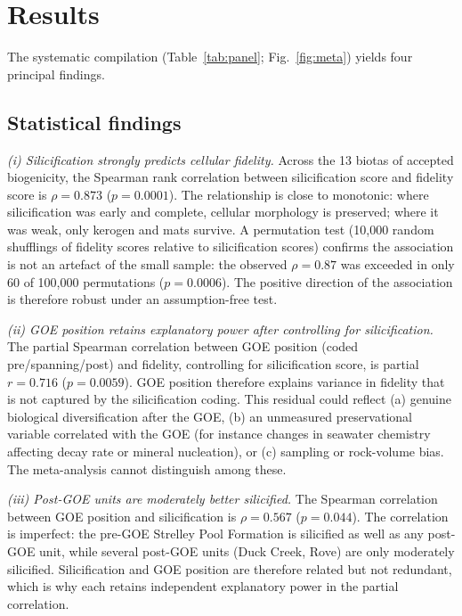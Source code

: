 \documentclass[11pt]{article}
\begin{document}
\section{Results}

The systematic compilation (Table~\ref{tab:panel}; Fig.~\ref{fig:meta}) yields four principal
findings.

\subsection{Statistical findings}

\textit{(i) Silicification strongly predicts cellular fidelity.} Across the 13 biotas of accepted
biogenicity, the Spearman rank correlation between silicification score and fidelity score is
$\rho = 0.873$ ($p = 0.0001$). The relationship is close to monotonic: where silicification was
early and complete, cellular morphology is preserved; where it was weak, only kerogen and mats
survive. A permutation test (10{,}000 random shufflings of fidelity scores relative to silicification
scores) confirms the association is not an artefact of the small sample: the observed $\rho = 0.87$
was exceeded in only 60 of 100{,}000 permutations ($p = 0.0006$). The positive direction of the
association is therefore robust under an assumption-free test.

\textit{(ii) GOE position retains explanatory power after controlling for silicification.} The
partial Spearman correlation between GOE position (coded pre/spanning/post) and fidelity,
controlling for silicification score, is partial $r = 0.716$ ($p = 0.0059$). GOE position therefore
explains variance in fidelity that is not captured by the silicification coding. This residual could
reflect (a) genuine biological diversification after the GOE, (b) an unmeasured preservational
variable correlated with the GOE (for instance changes in seawater chemistry affecting decay rate or
mineral nucleation), or (c) sampling or rock-volume bias. The meta-analysis cannot distinguish among
these.

\textit{(iii) Post-GOE units are moderately better silicified.} The Spearman correlation between GOE
position and silicification is $\rho = 0.567$ ($p = 0.044$). The correlation is imperfect: the
pre-GOE Strelley Pool Formation is silicified as well as any post-GOE unit, while several post-GOE
units (Duck Creek, Rove) are only moderately silicified. Silicification and GOE position are
therefore related but not redundant, which is why each retains independent explanatory power in the
partial correlation.
\end{document}

